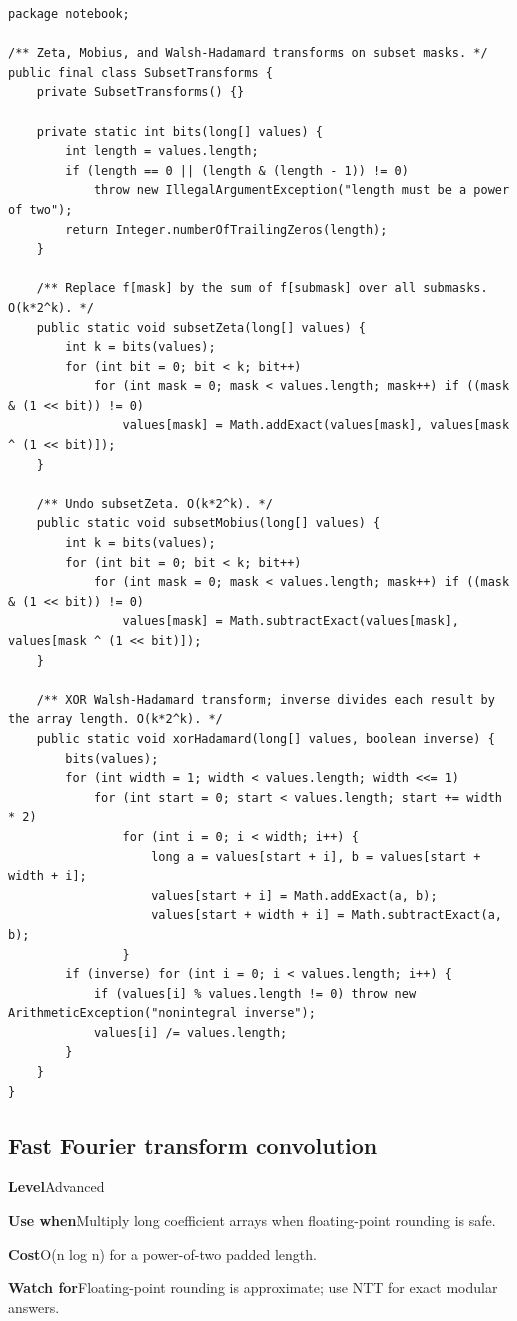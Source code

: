 \documentclass[10pt,letterpaper]{article}
\newcommand{\entrylabel}[1]{\textcolor{accent}{\bfseries #1}}
\begin{document}
\begin{lstlisting}
package notebook;

/** Zeta, Mobius, and Walsh-Hadamard transforms on subset masks. */
public final class SubsetTransforms {
    private SubsetTransforms() {}

    private static int bits(long[] values) {
        int length = values.length;
        if (length == 0 || (length & (length - 1)) != 0)
            throw new IllegalArgumentException("length must be a power of two");
        return Integer.numberOfTrailingZeros(length);
    }

    /** Replace f[mask] by the sum of f[submask] over all submasks. O(k*2^k). */
    public static void subsetZeta(long[] values) {
        int k = bits(values);
        for (int bit = 0; bit < k; bit++)
            for (int mask = 0; mask < values.length; mask++) if ((mask & (1 << bit)) != 0)
                values[mask] = Math.addExact(values[mask], values[mask ^ (1 << bit)]);
    }

    /** Undo subsetZeta. O(k*2^k). */
    public static void subsetMobius(long[] values) {
        int k = bits(values);
        for (int bit = 0; bit < k; bit++)
            for (int mask = 0; mask < values.length; mask++) if ((mask & (1 << bit)) != 0)
                values[mask] = Math.subtractExact(values[mask], values[mask ^ (1 << bit)]);
    }

    /** XOR Walsh-Hadamard transform; inverse divides each result by the array length. O(k*2^k). */
    public static void xorHadamard(long[] values, boolean inverse) {
        bits(values);
        for (int width = 1; width < values.length; width <<= 1)
            for (int start = 0; start < values.length; start += width * 2)
                for (int i = 0; i < width; i++) {
                    long a = values[start + i], b = values[start + width + i];
                    values[start + i] = Math.addExact(a, b);
                    values[start + width + i] = Math.subtractExact(a, b);
                }
        if (inverse) for (int i = 0; i < values.length; i++) {
            if (values[i] % values.length != 0) throw new ArithmeticException("nonintegral inverse");
            values[i] /= values.length;
        }
    }
}
\end{lstlisting}
\subsection{Fast Fourier transform convolution}
\begin{guidebox}\small
\entrylabel{Level}\quad Advanced\par
\entrylabel{Use when}\quad Multiply long coefficient arrays when floating-point rounding is safe.\par
\entrylabel{Cost}\quad O(n log n) for a power-of-two padded length.\par
\entrylabel{Watch for}\quad Floating-point rounding is approximate; use NTT for exact modular answers.\par
\end{guidebox}
\end{document}
